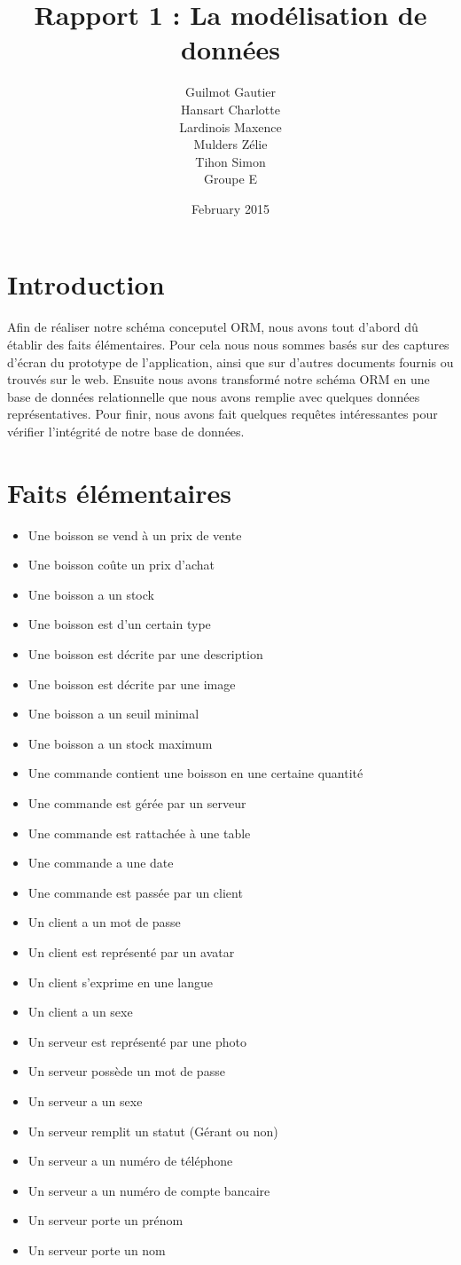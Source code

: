 \documentclass{article}
\title{Rapport 1 : La modélisation de données}
\author{Guilmot Gautier \\ Hansart Charlotte \\ Lardinois Maxence \\ Mulders Zélie \\ Tihon Simon \\ Groupe E }
\date{February 2015}
\begin{document}
\maketitle

\section{Introduction}
Afin de réaliser notre schéma conceputel ORM, nous avons tout d'abord dû établir des faits élémentaires. Pour cela nous nous sommes basés sur des captures d'écran du prototype de l'application, ainsi que sur d'autres documents fournis ou trouvés sur le web. Ensuite nous avons transformé notre schéma ORM en une base de données relationnelle que nous avons remplie avec quelques données représentatives. Pour finir, nous avons fait quelques requêtes intéressantes pour vérifier l'intégrité de notre base de données.

\section{Faits élémentaires}
\begin{itemize}\renewcommand{\labelitemi}{$\bullet$}
\item Une boisson se vend à un prix de vente 
\item Une boisson coûte un prix d'achat
\item Une boisson a un stock
\item Une boisson est d'un certain type
\item Une boisson est décrite par une description
\item Une boisson est décrite par une image
\item Une boisson a un seuil minimal 
\item Une boisson a un stock maximum
\item Une commande contient une boisson en une certaine quantité
\item Une commande est gérée par un serveur
\item Une commande est rattachée à une table
\item Une commande a une date
\item Une commande est passée par un client
\item Un client a un mot de passe
\item Un client est représenté par un avatar
\item Un client s'exprime en une langue
\item Un client a un sexe
\item Un serveur est représenté par une photo
\item Un serveur possède un mot de passe
\item Un serveur a un sexe 
\item Un serveur remplit un statut (Gérant ou non)
\item Un serveur a un numéro de téléphone
\item Un serveur a un numéro de compte bancaire
\item Un serveur porte un prénom
\item Un serveur porte un nom


\end{itemize}
\end{document}
